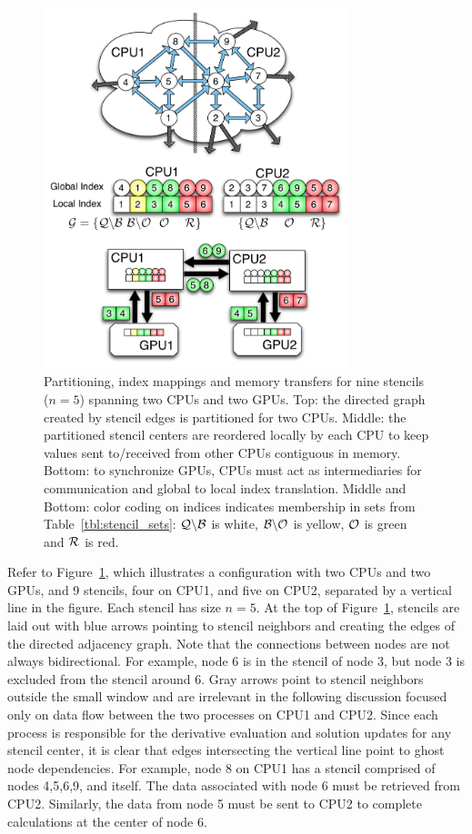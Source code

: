 \documentclass{report}
\begin{document}
                \begin{figure}[ht] 
            \centering
            \includegraphics[width=3.5in]{../figures/paper1/figures/omnigraffle/SimpleExample.pdf}  
            \caption{Partitioning, index mappings and memory transfers for nine stencils ($n=5$) spanning two CPUs and two GPUs. Top: the directed graph created by stencil edges is partitioned for two CPUs. Middle: the partitioned stencil centers are reordered locally by each CPU to keep values sent to/received from other CPUs contiguous in memory. Bottom: to synchronize GPUs, CPUs must act as intermediaries for communication and global to local index translation. Middle and Bottom: color coding on indices indicates membership in sets from Table~\ref{tbl:stencil_sets}: $\mathcal{Q} \backslash \mathcal{B}$ is white, $\mathcal{B} \backslash \mathcal{O}$ is yellow, $\mathcal{O}$ is green and $\mathcal{R}$ is red.
            }
            \label{fig:stencilSets2CPU}
        \end{figure}	

Refer to Figure~\ref{fig:stencilSets2CPU}, which illustrates a configuration with two 
CPUs and two GPUs, and 9 stencils, four on CPU1, and five on CPU2, separated
by a vertical line in the figure. Each stencil
has size $n=5$. At the top of Figure~\ref{fig:stencilSets2CPU}, stencils are laid out
with blue arrows pointing to stencil neighbors and creating the edges of the directed adjacency graph. Note that the connections between nodes are not 
always bidirectional. For example, node 6 is in the stencil of node 3, but 
node 3 is excluded from the stencil around 6. 
Gray arrows point to stencil neighbors outside the small window and are irrelevant in the following discussion focused only on data flow between the two processes on CPU1 and CPU2. 
Since each process is responsible for the derivative evaluation and solution updates for any stencil center, it is clear that edges intersecting the vertical line point to ghost node dependencies. For example, node 8 on CPU1 has a stencil comprised of
nodes 4,5,6,9, and itself. The data associated with node 6 must be retrieved
from CPU2. Similarly, the data from node 5 must be sent to CPU2 to 
complete calculations at the center of node 6.
\end{document}
